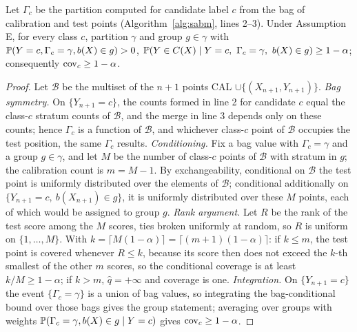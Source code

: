\documentclass[10pt]{article}
\begin{document}
\begin{theorem}\label{thm:S}
Let $\Gamma_c$ be the partition computed for candidate label $c$ from the bag of calibration and test points (Algorithm~\ref{alg:sabm}, lines 2--3). Under Assumption E, for every class $c$, partition $\gamma$ and group $g\in\gamma$ with $\mathbb{P}(Y=c,\Gamma_c=\gamma,b(X)\in g)>0$, $\Prob(Y\in C(X)\mid Y=c,\ \Gamma_c=\gamma,\ b(X)\in g)\ge1-\alpha$; consequently $\mathrm{cov}_c\ge1-\alpha$.
\end{theorem}
\begin{proof}
Let $\mathcal B$ be the multiset of the $n+1$ points CAL $\cup\{(X_{n+1},Y_{n+1})\}$. \emph{Bag symmetry.} On $\{Y_{n+1}=c\}$, the counts formed in line 2 for candidate $c$ equal the class-$c$ stratum counts of $\mathcal B$, and the merge in line 3 depends only on these counts; hence $\Gamma_c$ is a function of $\mathcal B$, and whichever class-$c$ point of $\mathcal B$ occupies the test position, the same $\Gamma_c$ results. \emph{Conditioning.} Fix a bag value with $\Gamma_c=\gamma$ and a group $g\in\gamma$, and let $M$ be the number of class-$c$ points of $\mathcal B$ with stratum in $g$; the calibration count is $m=M-1$. By exchangeability, conditional on $\mathcal B$ the test point is uniformly distributed over the elements of $\mathcal B$; conditional additionally on $\{Y_{n+1}=c,\ b(X_{n+1})\in g\}$, it is uniformly distributed over these $M$ points, each of which would be assigned to group $g$. \emph{Rank argument.} Let $R$ be the rank of the test score among the $M$ scores, ties broken uniformly at random, so $R$ is uniform on $\{1,\dots,M\}$. With $k=\lceil M(1-\alpha)\rceil=\lceil(m+1)(1-\alpha)\rceil$: if $k\le m$, the test point is covered whenever $R\le k$, because its score then does not exceed the $k$-th smallest of the other $m$ scores, so the conditional coverage is at least $k/M\ge1-\alpha$; if $k>m$, $\hat q=+\infty$ and coverage is one. \emph{Integration.} On $\{Y_{n+1}=c\}$ the event $\{\Gamma_c=\gamma\}$ is a union of bag values, so integrating the bag-conditional bound over those bags gives the group statement; averaging over groups with weights $\mathbb{P}(\Gamma_c=\gamma,b(X)\in g\mid Y=c)$ gives $\mathrm{cov}_c\ge1-\alpha$.
\end{proof}
\end{document}
